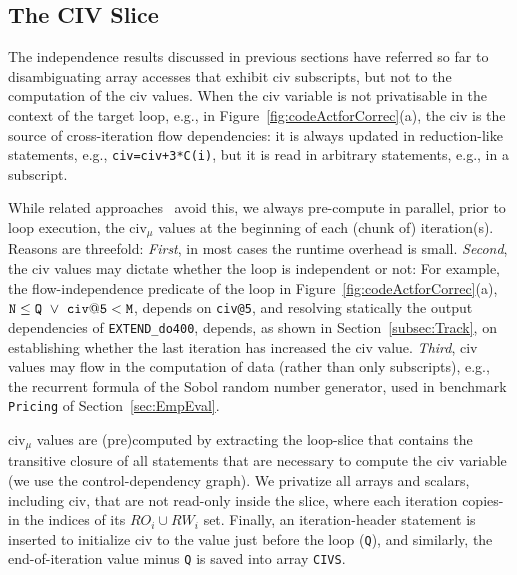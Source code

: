 \documentclass[10pt,nocopyrightspace]{sigplanconf}
\begin{document}
\subsection{The CIV Slice}
\label{subsect:CivImplem}

The independence results discussed in previous sections have referred 
so far to disambiguating array accesses that exhibit {\sc civ} 
subscripts, but not to the computation of the {\sc civ} values.
%
When the {\sc civ} variable is not privatisable in the context of the 
target loop, e.g., in Figure~\ref{fig:codeActforCorrec}(a), 
the {\sc civ} is the source of cross-iteration flow dependencies: 
it is always updated in reduction-like statements, e.g., {\tt civ=civ+3*C(i)},
but it is read in arbitrary statements, e.g., in a subscript.

While related approaches~\cite{PaduaDemDrInterproc,VEG} avoid this, we always pre-compute in
parallel, prior to loop execution, the {\sc civ}$_\mu$ values at the beginning 
of each (chunk of) iteration(s).
Reasons are threefold: {\em First}, in most cases 
the runtime overhead is small. {\em Second}, the {\sc civ} values may dictate
whether the loop is independent or not: For example,  the flow-independence
predicate of the loop in Figure~\ref{fig:codeActforCorrec}(a), 
${\tt N} \le {\tt Q}~\vee~{\tt civ@5} < {\tt M}$,
depends on {\tt civ@5}, and resolving statically the output 
dependencies of {\tt EXTEND\_do400}, depends, as
shown in Section~\ref{subsec:Track}, on establishing whether the last
iteration has increased the {\sc civ} value. 
%
{\em Third}, {\sc civ} values may flow in the computation
of data (rather than only subscripts), e.g., the recurrent
formula of the Sobol random number generator, used in
benchmark {\tt Pricing}  of Section~\ref{sec:EmpEval}.

{\sc civ}$_\mu$ values are (pre)computed by extracting the loop-slice
that contains the transitive closure of all statements 
that are necessary to compute the {\sc civ} variable
(we use the control-dependency graph). 
We privatize all arrays and scalars, including {\sc civ}, that are not 
read-only inside the slice, where each iteration copies-in the  indices 
of its $RO_i \cup RW_i$ set. Finally, an iteration-header statement is 
inserted to initialize {\sc civ} to the value just before the loop ({\tt Q}), 
and similarly, the end-of-iteration value minus {\tt Q} is saved into array 
{\tt CIVS}.  
\end{document}
